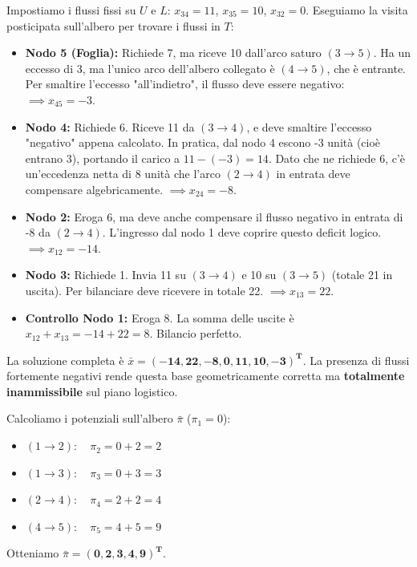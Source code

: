 \documentclass[12pt, a4paper]{article}
\begin{document}
	Impostiamo i flussi fissi su $U$ e $L$: $x_{34} = 11$, $x_{35} = 10$, $x_{32} = 0$.
	Eseguiamo la visita posticipata sull'albero per trovare i flussi in $T$:
	\begin{itemize}
		\item \textbf{Nodo 5 (Foglia):} Richiede 7, ma riceve 10 dall'arco saturo $(3\to5)$. Ha un eccesso di 3, ma l'unico arco dell'albero collegato è $(4\to5)$, che è entrante. Per smaltire l'eccesso "all'indietro", il flusso deve essere negativo: $\implies x_{45} = -3$.
		\item \textbf{Nodo 4:} Richiede 6. Riceve 11 da $(3\to4)$, e deve smaltire l'eccesso "negativo" appena calcolato. In pratica, dal nodo 4 escono -3 unità (cioè entrano 3), portando il carico a $11 - (-3) = 14$. Dato che ne richiede 6, c'è un'eccedenza netta di 8 unità che l'arco $(2\to4)$ in entrata deve compensare algebricamente. $\implies x_{24} = -8$.
		\item \textbf{Nodo 2:} Eroga 6, ma deve anche compensare il flusso negativo in entrata di -8 da $(2\to4)$. L'ingresso dal nodo 1 deve coprire questo deficit logico. $\implies x_{12} = -14$.
		\item \textbf{Nodo 3:} Richiede 1. Invia 11 su $(3\to4)$ e 10 su $(3\to5)$ (totale 21 in uscita). Per bilanciare deve ricevere in totale 22. $\implies x_{13} = 22$.
		\item \textbf{Controllo Nodo 1:} Eroga 8. La somma delle uscite è $x_{12} + x_{13} = -14 + 22 = 8$. Bilancio perfetto.
	\end{itemize}
	La soluzione completa è $\bar{x} = \mathbf{(-14, 22, -8, 0, 11, 10, -3)^T}$. La presenza di flussi fortemente negativi rende questa base geometricamente corretta ma \textbf{totalmente inammissibile} sul piano logistico.
	
	Calcoliamo i potenziali sull'albero $\bar{\pi}$ ($\pi_1 = 0$):
	\begin{itemize}
		\item $(1\to2): \quad \pi_2 = 0 + 2 = 2$
		\item $(1\to3): \quad \pi_3 = 0 + 3 = 3$
		\item $(2\to4): \quad \pi_4 = 2 + 2 = 4$
		\item $(4\to5): \quad \pi_5 = 4 + 5 = 9$
	\end{itemize}
	Otteniamo $\bar{\pi} = \mathbf{(0, 2, 3, 4, 9)^T}$.
	
\end{document}
